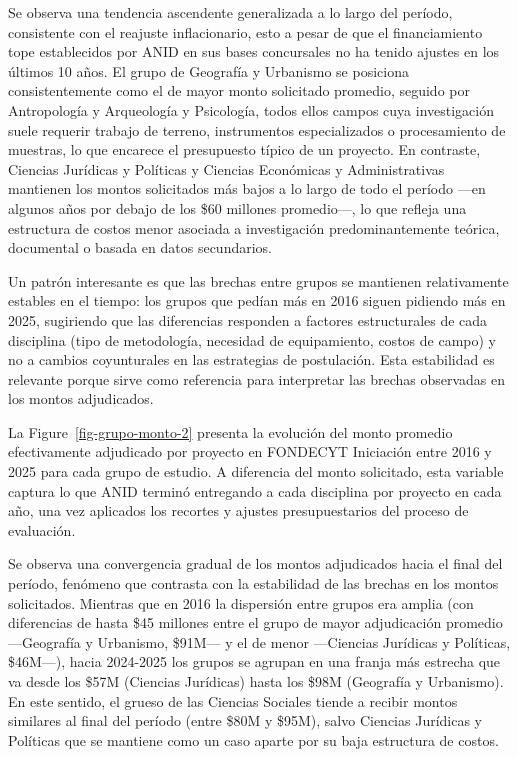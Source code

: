 \documentclass[
  12pt,
  letterpaper,
]{article}
\begin{document}
Se observa una tendencia ascendente generalizada a lo largo del período,
consistente con el reajuste inflacionario, esto a pesar de que el
financiamiento tope establecidos por ANID en sus bases concursales no ha
tenido ajustes en los últimos 10 años. El grupo de Geografía y Urbanismo
se posiciona consistentemente como el de mayor monto solicitado
promedio, seguido por Antropología y Arqueología y Psicología, todos
ellos campos cuya investigación suele requerir trabajo de terreno,
instrumentos especializados o procesamiento de muestras, lo que encarece
el presupuesto típico de un proyecto. En contraste, Ciencias Jurídicas y
Políticas y Ciencias Económicas y Administrativas mantienen los montos
solicitados más bajos a lo largo de todo el período ---en algunos años
por debajo de los \$60 millones promedio---, lo que refleja una
estructura de costos menor asociada a investigación predominantemente
teórica, documental o basada en datos secundarios.

Un patrón interesante es que las brechas entre grupos se mantienen
relativamente estables en el tiempo: los grupos que pedían más en 2016
siguen pidiendo más en 2025, sugiriendo que las diferencias responden a
factores estructurales de cada disciplina (tipo de metodología,
necesidad de equipamiento, costos de campo) y no a cambios coyunturales
en las estrategias de postulación. Esta estabilidad es relevante porque
sirve como referencia para interpretar las brechas observadas en los
montos adjudicados.

La Figure~\ref{fig-grupo-monto-2} presenta la evolución del monto
promedio efectivamente adjudicado por proyecto en FONDECYT Iniciación
entre 2016 y 2025 para cada grupo de estudio. A diferencia del monto
solicitado, esta variable captura lo que ANID terminó entregando a cada
disciplina por proyecto en cada año, una vez aplicados los recortes y
ajustes presupuestarios del proceso de evaluación.

Se observa una convergencia gradual de los montos adjudicados hacia el
final del período, fenómeno que contrasta con la estabilidad de las
brechas en los montos solicitados. Mientras que en 2016 la dispersión
entre grupos era amplia (con diferencias de hasta \$45 millones entre el
grupo de mayor adjudicación promedio ---Geografía y Urbanismo, \$91M---
y el de menor ---Ciencias Jurídicas y Políticas, \$46M---), hacia
2024-2025 los grupos se agrupan en una franja más estrecha que va desde
los \$57M (Ciencias Jurídicas) hasta los \$98M (Geografía y Urbanismo).
En este sentido, el grueso de las Ciencias Sociales tiende a recibir
montos similares al final del período (entre \$80M y \$95M), salvo
Ciencias Jurídicas y Políticas que se mantiene como un caso aparte por
su baja estructura de costos.
\end{document}
